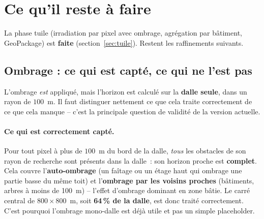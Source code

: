 \documentclass[11pt,a4paper]{article}
\begin{document}
\section{Ce qu'il reste à faire}
\label{sec:afaire}

La phase tuile (irradiation par pixel avec ombrage, agrégation par bâtiment,
GeoPackage) est \textbf{faite} (section~\ref{sec:tuile}). Restent les
raffinements suivants.

\subsection{Ombrage : ce qui est capté, ce qui ne l'est pas}
\label{sec:ombrage-limites}

L'ombrage \emph{est} appliqué, mais l'horizon est calculé sur la \textbf{dalle
seule}, dans un rayon de $100$~m. Il faut distinguer nettement ce que cela traite
correctement de ce que cela manque -- c'est la principale question de validité de
la version actuelle.

\paragraph{Ce qui est correctement capté.} Pour tout pixel à plus de $100$~m du
bord de la dalle, \emph{tous} les obstacles de son rayon de recherche sont
présents dans la dalle~: son horizon proche est \textbf{complet}. Cela couvre
l'\textbf{auto-ombrage} (un faîtage ou un étage haut qui ombrage une partie basse
du même toit) et l'\textbf{ombrage par les voisins proches} (bâtiments, arbres à
moins de 100~m) -- l'effet d'ombrage dominant en zone bâtie. Le carré central de
$800\times800$~m, soit \textbf{64\,\% de la dalle}, est donc traité correctement.
C'est pourquoi l'ombrage mono-dalle est déjà utile et pas un simple placeholder.
\end{document}
